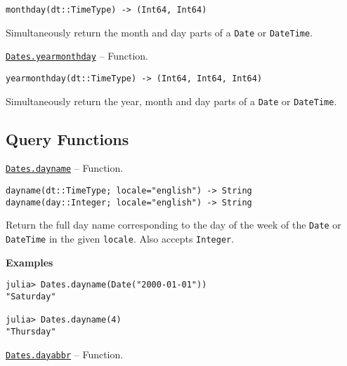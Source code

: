 \begin{adjustwidth}{2em}{0pt}


\begin{verbatim}
monthday(dt::TimeType) -> (Int64, Int64)
\end{verbatim}

Simultaneously return the month and day parts of a \texttt{Date} or \texttt{DateTime}.



\end{adjustwidth}
\hypertarget{18225305010779633841}{}
\hyperlink{18225305010779633841}{\texttt{Dates.yearmonthday}}  -- {Function.}

\begin{adjustwidth}{2em}{0pt}


\begin{verbatim}
yearmonthday(dt::TimeType) -> (Int64, Int64, Int64)
\end{verbatim}

Simultaneously return the year, month and day parts of a \texttt{Date} or \texttt{DateTime}.



\end{adjustwidth}

\hypertarget{11589266561459327415}{}


\subsection{Query Functions}


\hypertarget{2440842966718954493}{}
\hyperlink{2440842966718954493}{\texttt{Dates.dayname}}  -- {Function.}

\begin{adjustwidth}{2em}{0pt}


\begin{verbatim}
dayname(dt::TimeType; locale="english") -> String
dayname(day::Integer; locale="english") -> String
\end{verbatim}

Return the full day name corresponding to the day of the week of the \texttt{Date} or \texttt{DateTime} in the given \texttt{locale}. Also accepts \texttt{Integer}.

\textbf{Examples}


\begin{verbatim}
julia> Dates.dayname(Date("2000-01-01"))
"Saturday"

julia> Dates.dayname(4)
"Thursday"
\end{verbatim}



\end{adjustwidth}
\hypertarget{18198970391837299875}{}
\hyperlink{18198970391837299875}{\texttt{Dates.dayabbr}}  -- {Function.}

